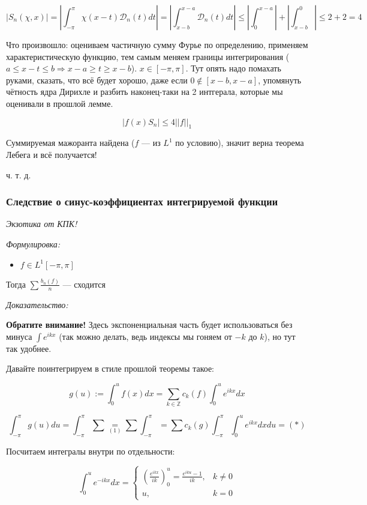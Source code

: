 \documentclass{article}
\def\DD{\mathcal{D}}
\begin{document}
\[|S_n(\chi, x)| = \left| \int_{-\pi}^{\pi} \chi(x - t)\DD_n(t) dt\right| = \left|\int_{x - b}^{x - a} \DD_n(t) dt \right| \le \left| \int_{0}^{x - a} \right| + \left| \int_{x - b}^{0}\right| \le 2 + 2 = 4\]

Что произвошло: оцениваем частичную сумму Фурье по определению, применяем характеристическую функцию, тем самым меняем границы интегрирования ($a \le x - t \le b \Rightarrow x - a \ge t \ge x - b$). $x \in [-\pi, \pi]$. Тут опять надо помахать руками, сказать, что всё будет хорошо, даже если $0 \notin [x - b, x - a]$, упомянуть чётность ядра Дирихле и разбить наконец-таки на 2 интгерала, которые мы оценивали в прошлой лемме.

\[|f(x)S_n| \le 4||f||_1\]

Суммируемая мажоранта найдена ($f$ --- из $L^1$ по условию), значит верна теорема Лебега и всё получается!

ч. т. д. 

\subsubsection{Следствие о синус-коэффициентах интегрируемой функции}

\textit{Экзотика от КПК!}

\textit{Формулировка:}

\begin{itemize}
    \item $f \in L^1[-\pi, \pi]$ 
\end{itemize}

Тогда $\sum \frac{b_n(f)}{n}$ --- сходится

\textit{Доказательство:}

\textbf{Обратите внимание!} Здесь экспоненциальная часть будет использоваться без минуса $\int e^{ikx}$ (так можно делать, ведь индексы мы гоняем от $-k$ до $k$), но тут так удобнее.

Давайте поинтегрируем в стиле прошлой теоремы такое:

\[g(u) := \int_{0}^{u} f(x)dx = \sum_{k \in \mathbb{Z}} c_k(f) \int_0^u e^{ikx} dx\]

\[\int_{-\pi}^{\pi} g(u) du = \int_{-\pi}^{\pi} \sum \underset{(1)}{=} \sum \int_{-\pi}^{\pi} = \sum c_k(g) \int_{-\pi}^{\pi} \int_{0}^{u} e^{ikx}dxdu = (*)\]

Посчитаем интегралы внутри по отдельности:

\[\int_{0}^{u} e^{-ikx}dx = \begin{cases}
    \left(\frac{e^{ikx}}{ik} \right)_0^{u} = \frac{e^{iku} - 1}{ik}, &k \neq 0\\
    u, &k = 0
\end{cases}\]
\end{document}

